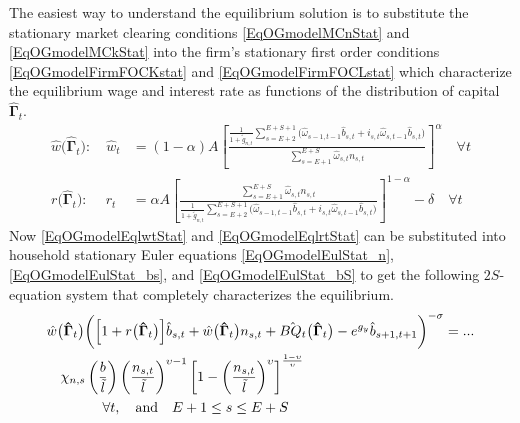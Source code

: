 \documentclass[letterpaper,12pt]{article}
\theoremstyle{definition}
\begin{document}
    The easiest way to understand the equilibrium solution is to substitute the stationary market clearing conditions \eqref{EqOGmodelMCnStat} and \eqref{EqOGmodelMCkStat} into the firm's stationary first order conditions \eqref{EqOGmodelFirmFOCKstat} and \eqref{EqOGmodelFirmFOCLstat} which characterize the equilibrium wage and interest rate as functions of the distribution of capital $\bm{\hat{\Gamma}}_t$.
    \begin{align}
      \hat{w}\bigl(\bm{\hat{\Gamma}}_t\bigr):\quad \hat{w}_t &= (1-\alpha)A\left[\frac{\frac{1}{1+\tilde{g}_{n,t}}\sum_{s=E+2}^{E+S+1}\bigl(\hat{\omega}_{s-1,t-1}\hat{b}_{s,t} + i_{s,t}\hat{\omega}_{s,t-1}\hat{b}_{s,t}\bigr)}{\sum_{s=E+1}^{E+S} \hat{\omega}_{s,t}n_{s,t}}\right]^\alpha \quad\forall t \label{EqOGmodelEqlwtStat} \\
      r\bigl(\bm{\hat{\Gamma}}_t\bigr):\:\quad r_t &= \alpha A\left[\frac{\sum_{s=E+1}^{E+S} \hat{\omega}_{s,t}n_{s,t}}{\frac{1}{1+\tilde{g}_{n,t}}\sum_{s=E+2}^{E+S+1}\bigl(\hat{\omega}_{s-1,t-1}\hat{b}_{s,t} + i_{s,t}\hat{\omega}_{s,t-1}\hat{b}_{s,t}\bigr)}\right]^{1-\alpha} - \delta \quad\forall t \label{EqOGmodelEqlrtStat}
    \end{align}
    Now \eqref{EqOGmodelEqlwtStat} and \eqref{EqOGmodelEqlrtStat} can be substituted into household stationary Euler equations \eqref{EqOGmodelEulStat_n}, \eqref{EqOGmodelEulStat_bs}, and \eqref{EqOGmodelEulStat_bS} to get the following $2S$-equation system that completely characterizes the equilibrium.
    \begin{equation}\label{EqOGmodelEqlEulStat_n_Gamma}
      \begin{split}
        &\hat{w}\bigl(\bm{\hat{\Gamma}}_t\bigr)\biggl(\Bigl[1 + r\bigl(\bm{\hat{\Gamma}}_t\bigr)\Bigr]\hat{b}_{s,t} + \hat{w}\bigl(\bm{\hat{\Gamma}}_t\bigr)n_{s,t} + \hat{BQ_t}\bigl(\bm{\hat{\Gamma}}_t\bigr) - e^{g_y}\hat{b}_{s+1,t+1}\biggr)^{-\sigma} = ...  \\
        & \quad \chi_{n,s}\left(\frac{b}{\tilde{l}}\right)\left(\frac{n_{s,t}}{\tilde{l}}\right)^{\upsilon - 1}\left[1 - \left(\frac{n_{s,t}}{\tilde{l}}\right)^\upsilon\right]^\frac{1-\upsilon}{\upsilon} \\
        &\qquad\qquad\forall t,\quad\text{and}\quad E+1\leq s\leq E+S
      \end{split}
    \end{equation}
\end{document}
